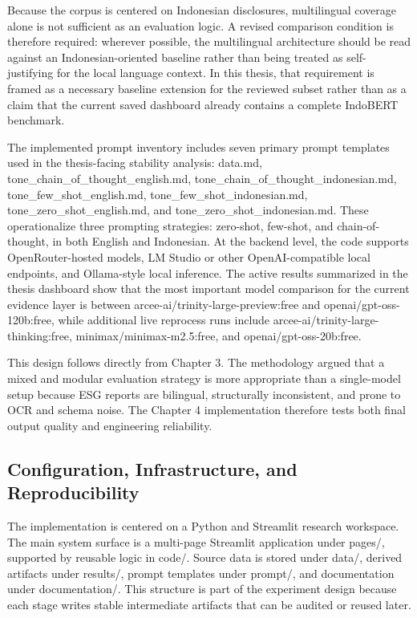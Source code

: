 \documentclass[english, online, cse, master]{dithesis}
\begin{document}
Because the corpus is centered on Indonesian disclosures, multilingual coverage alone is not sufficient as an evaluation logic. A revised comparison condition is therefore required: wherever possible, the multilingual architecture should be read against an Indonesian-oriented baseline rather than being treated as self-justifying for the local language context. In this thesis, that requirement is framed as a necessary baseline extension for the reviewed subset rather than as a claim that the current saved dashboard already contains a complete IndoBERT benchmark.

The implemented prompt inventory includes seven primary prompt templates used in the thesis-facing stability analysis: data.md, tone\_chain\_of\_thought\_english.md, tone\_chain\_of\_thought\_indonesian.md, tone\_few\_shot\_english.md, tone\_few\_shot\_indonesian.md, tone\_zero\_shot\_english.md, and tone\_zero\_shot\_indonesian.md. These operationalize three prompting strategies: zero-shot, few-shot, and chain-of-thought, in both English and Indonesian. At the backend level, the code supports OpenRouter-hosted models, LM Studio or other OpenAI-compatible local endpoints, and Ollama-style local inference. The active results summarized in the thesis dashboard show that the most important model comparison for the current evidence layer is between arcee-ai/trinity-large-preview:free and openai/gpt-oss-120b:free, while additional live reprocess runs include arcee-ai/trinity-large-thinking:free, minimax/minimax-m2.5:free, and openai/gpt-oss-20b:free.

This design follows directly from Chapter 3. The methodology argued that a mixed and modular evaluation strategy is more appropriate than a single-model setup because ESG reports are bilingual, structurally inconsistent, and prone to OCR and schema noise. The Chapter 4 implementation therefore tests both final output quality and engineering reliability.

\subsection{Configuration, Infrastructure, and Reproducibility}

The implementation is centered on a Python and Streamlit research workspace. The main system surface is a multi-page Streamlit application under pages/, supported by reusable logic in code/. Source data is stored under data/, derived artifacts under results/, prompt templates under prompt/, and documentation under documentation/. This structure is part of the experiment design because each stage writes stable intermediate artifacts that can be audited or reused later.
\end{document}
